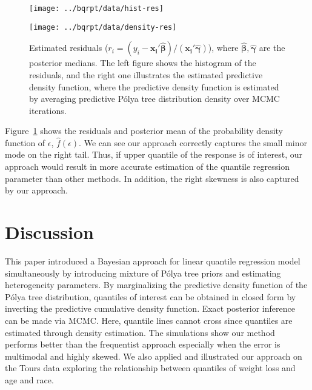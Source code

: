 \documentclass[12pt]{article}
\newcommand{\polya}{P\'{o}lya}
\begin{document}
\begin{figure}[htbp]
  \begin{minipage}{0.5\linewidth}
    \centerline{\texttt{[image: ../bqrpt/data/hist-res]}}
  \end{minipage}
  \begin{minipage}{0.5\linewidth} 
    \centerline{\texttt{[image: ../bqrpt/data/density-res]}}
  \end{minipage}
  \caption[]{\label{fig:tourpost} Estimated residuals ($r_i = (y_i-
    \bm{x_i'\hat{\beta}})/(\bm{x_i'\hat{\gamma}})$), where
    $\hat{\bm{\beta}}, \hat{\bm{\gamma}}$ are the posterior medians. The left
    figure shows the histogram of the residuals, and the right one
    illustrates the estimated predictive density function, where the
    predictive density function is estimated by averaging predictive
    \polya{} tree distribution density over MCMC iterations.} 
\end{figure}

Figure~\ref{fig:tourpost} shows the residuals and posterior mean of the
probability density function of $\epsilon$, $\hat{f}(\epsilon)$. We
can see our approach correctly captures the small minor mode on
the right tail. Thus, if upper quantile of the response is of interest, our
approach would result in more accurate estimation of the quantile regression
parameter than other methods. In addition, the right skewness is also
captured by our approach.

\section{Discussion}
This paper introduced a Bayesian approach for linear quantile regression
model simultaneously by introducing mixture of \polya{} tree
priors and estimating heterogeneity parameters. By marginalizing the
predictive density function of the \polya{} tree distribution, quantiles
of interest can be obtained in closed form by inverting the predictive cumulative
density function. Exact posterior inference can be made via
MCMC. Here, quantile lines cannot cross since 
quantiles are estimated through density estimation. 
The simulations show our method performs better than the frequentist
approach especially when the error is multimodal and highly skewed. We
also applied and illustrated our approach on the Tours data exploring
the relationship between  quantiles of weight loss and age
and race. 
\end{document}
